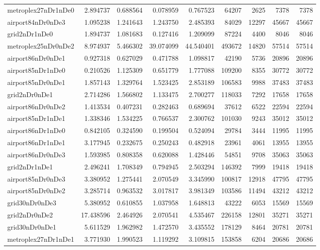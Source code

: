 \begin{longtable}{|l|r|r|r|r|r|r|r|r|}
metroplex27nDr1nDe0 & 2.894737 & 0.688564 & 0.078959 & 0.767523 & 64207 & 2625 & 7378 & 7378 \\
airport84nDr0nDe3 & 1.095238 & 1.241643 & 1.243750 & 2.485393 & 84029 & 12297 & 45667 & 45667 \\
grid2nDr1nDe0 & 1.894737 & 1.081683 & 0.127416 & 1.209099 & 87224 & 4400 & 8046 & 8046 \\
metroplex25nDr0nDe2 & 8.974937 & 5.466302 & 39.074099 & 44.540401 & 493672 & 14820 & 57514 & 57514 \\
airport86nDr0nDe1 & 0.927318 & 0.627029 & 0.471788 & 1.098817 & 42190 & 5736 & 20896 & 20896 \\
airport85nDr1nDe0 & 0.210526 & 1.125309 & 0.651779 & 1.777088 & 109200 & 8355 & 30772 & 30772 \\
airport85nDr0nDe1 & 1.857143 & 1.329764 & 1.523425 & 2.853189 & 106583 & 9988 & 37483 & 37483 \\
grid2nDr0nDe1 & 2.714286 & 1.566802 & 1.133475 & 2.700277 & 118033 & 7292 & 17658 & 17658 \\
airport86nDr0nDe2 & 1.413534 & 0.407231 & 0.282463 & 0.689694 & 37612 & 6522 & 22594 & 22594 \\
airport85nDr1nDe1 & 1.338346 & 1.534225 & 0.766537 & 2.300762 & 101030 & 9243 & 35012 & 35012 \\
airport86nDr1nDe0 & 0.842105 & 0.324590 & 0.199504 & 0.524094 & 29784 & 3444 & 11995 & 11995 \\
airport86nDr1nDe1 & 3.177945 & 0.232675 & 0.250243 & 0.482918 & 23961 & 4061 & 13955 & 13955 \\
airport86nDr0nDe3 & 1.593985 & 0.808358 & 0.620088 & 1.428446 & 54851 & 9708 & 35063 & 35063 \\
grid2nDr1nDe1 & 2.496241 & 1.708349 & 0.794945 & 2.503294 & 146392 & 7999 & 19418 & 19418 \\
airport85nDr0nDe3 & 3.380952 & 1.275441 & 2.070549 & 3.345990 & 100817 & 12918 & 47795 & 47795 \\
airport85nDr0nDe2 & 3.285714 & 0.963532 & 3.017817 & 3.981349 & 103586 & 11494 & 43212 & 43212 \\
grid30nDr0nDe3 & 5.380952 & 0.610855 & 1.037958 & 1.648813 & 43222 & 6053 & 15569 & 15569 \\
grid2nDr0nDe2 & 17.438596 & 2.464926 & 2.070541 & 4.535467 & 226158 & 12801 & 35271 & 35271 \\
grid30nDr0nDe1 & 5.611529 & 1.962982 & 1.472570 & 3.435552 & 178129 & 8464 & 20781 & 20781 \\
metroplex27nDr1nDe1 & 3.771930 & 1.990523 & 1.119292 & 3.109815 & 153858 & 6204 & 20686 & 20686 \\

\end{longtable}
